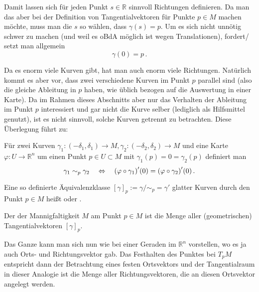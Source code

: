 \documentclass[../H_Analysis_main.tex]{subfiles}
\begin{document}
Damit lassen sich für jeden Punkt $s \in \mathbb{R}$ sinnvoll Richtungen definieren. Da man das aber bei der Definition von Tangentialvektoren für Punkte $p \in M$ machen möchte, muss man die $s$ so wählen, dass $\gamma(s) = p$. Um es sich nicht unnötig schwer zu machen (und weil es oBdA möglich ist wegen Translationen), fordert/ setzt man allgemein
\begin{equation}
\gamma(0) = p \, .
\end{equation}

Da es enorm viele Kurven gibt, hat man auch enorm viele Richtungen. Natürlich kommt es aber vor, dass zwei verschiedene Kurven im Punkt $p$ parallel sind (also die gleiche Ableitung in $p$ haben, wie üblich bezogen auf die Auswertung in einer Karte). Da im Rahmen dieses Abschnitts aber nur das Verhalten der Ableitung im Punkt $p$ interessiert und gar nicht die Kurve selber (lediglich als Hilfsmittel genutzt), ist es nicht sinnvoll, solche Kurven getrennt zu betrachten. Diese Überlegung führt zu:

\begin{defi}
Für zwei Kurven $\gamma_1: (-\delta_1, \delta_1) \rightarrow M, \gamma_2: (-\delta_2, \delta_2) \rightarrow M$ und eine Karte $\varphi: U \rightarrow \mathbb{R}^n$ um einen Punkt $p \in U \subset M$ mit $\gamma_1(p) = 0 = \gamma_2(p)$ definiert man
\begin{equation}
\gamma_1 \sim_p \gamma_2 \quad \Leftrightarrow \quad \qty(\varphi \circ \gamma_1)'(0) = \qty(\varphi \circ \gamma_2)'(0) \, .
\end{equation}

Eine so definierte Äquivalenzklasse $[\gamma]_p := \gamma/ \sim_p = \gamma'$ glatter Kurven durch den Punkt $p \in M$ heißt  oder .

Der  der Mannigfaltigkeit $M$ am Punkt $p \in M$ ist die Menge aller (geometrischen) Tangentialvektoren  $[\gamma]_p$.
\end{defi}

Das Ganze kann man sich nun wie bei einer Geraden im $\mathbb{R}^n$ vorstellen, wo es ja auch Orts- und Richtungsvektor gab. Das Festhalten des Punktes bei $T_p M$ entspricht dann der Betrachtung eines festen Ortsvektors und der Tangentialraum in dieser Analogie ist die Menge aller Richtungsvektoren, die an diesen Ortsvektor angelegt werden.
\end{document}
